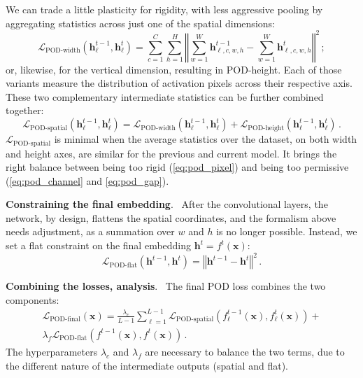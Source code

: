 \documentclass[runningheads]{llncs}
\newcommand{\mcL}{\mathcal{L}}
\newcommand{\vx}{\mathbf{x}}
\newcommand{\vh}{\mathbf{h}}
\newcommand{\parag}[1]{\vspace{0.2cm}\noindent\textbf{#1}.\ }
\begin{document}
We can trade a little plasticity for rigidity, with less aggressive pooling by aggregating statistics across just one of the spatial dimensions:
\begin{equation}
    \mcL_{\text{POD-width}}(\vh^{t-1}_\ell, \vh^t_\ell)  = \sum_{c=1}^{C} \sum_{h=1}^{H} \left\Vert \sum_{w=1}^W \vh^{t-1}_{\ell,c,w,h} - \sum_{w=1}^W \vh^{t}_{\ell,c,w,h} \right\Vert^2\label{eq:pod_width}\,;
\end{equation}
or, likewise, for the vertical dimension, resulting in POD-height. Each of those variants measure the distribution of activation pixels across their respective axis. These two complementary intermediate statistics can be further combined together:
\begin{equation}
    \mcL_{\text{POD-spatial}}(\vh^{t-1}_\ell, \vh^t_\ell) = \mcL_{\text{POD-width}}(\vh^{t-1}_\ell, \vh^t_\ell) + \mcL_{\text{POD-height}}(\vh^{t-1}_\ell, \vh^t_\ell)\,.
\end{equation}
$\mcL_{\text{POD-spatial}}$ is minimal when the average statistics over the dataset, on both width and height axes, are similar for the previous and current model. It brings the right balance between being too rigid (\autoref{eq:pod_pixel}) and being too permissive (\autoref{eq:pod_channel} and \ref{eq:pod_gap}).

\label{sec:pod_flat}
\parag{Constraining the final embedding} After the convolutional layers, the network, by design, flattens the spatial coordinates, and the formalism above needs adjustment, as a summation over $w$ and $h$ is no longer possible. Instead, we set a flat constraint on the final embedding $\vh^{t} = f^{t}(\vx)$:
\begin{equation}
    \mcL_{\text{POD-flat}}(\vh^{t-1}, \vh^t) = \left\Vert \vh^{t-1} - \vh^t \right\Vert^2\label{eq:POD-flat}\,.
\end{equation}

\parag{Combining the losses, analysis} The final POD loss combines the two  components:
\begin{multline}
    \mcL_\text{POD-final}(\vx) =  \frac{\lambda_{c}}{L-1}\sum_{\ell=1}^{L-1}  \mcL_{\text{POD-spatial}}\left(f^{t-1}_\ell(\vx), f^t_\ell(\vx)\right) + \\[-0.8em]
    \lambda_{f} \mcL_\text{POD-flat}\left(f^{t-1}(\vx), f^t(\vx)\right)\,.
\end{multline}
The hyperparameters $\lambda_{c}$ and $\lambda_{f}$ are necessary to balance the two terms, due to the  different nature of the intermediate outputs (spatial and flat).
\end{document}
